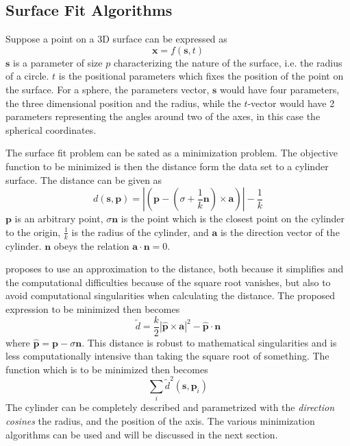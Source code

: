 \subsection{Surface Fit Algorithms}
\label{chap2:sec-surface-fit-alg}
Suppose a point on a 3D surface can be expressed as
\begin{equation}
    \mathbf{x} = f(\mathbf{s}, t)
\end{equation}
$\mathbf{s}$ is a parameter of size $p$ characterizing the nature of the surface, i.e. the
radius of a circle. $t$ is the positional parameters which fixes the position of the point
on the surface. For a sphere, the parameters vector, $\mathbf{s}$ would have four parameters,
the three dimensional position and the radius, while the $t$-vector would have 2
parameters representing the angles around two of the axes, in this case the spherical
coordinates.

The surface fit problem can be sated as a minimization problem. The
objective function to be minimized is then the distance form the data set to a cylinder
surface. The distance can be given as 
\begin{equation}
    d( \mathbf{s}, \mathbf{p})  = | ( \mathbf{p} - (\sigma + \frac{1}{k} \mathbf{n})
    \times \mathbf{a})| - \frac{1}{k}
\end{equation}
$\mathbf{p}$ is an arbitrary point, $\sigma \mathbf{n}$ is the point which is the closest
point on the cylinder to the origin, $\frac{1}{k}$ is the radius of the cylinder, and $\mathbf{a}$ is the
direction vector of the cylinder. $\mathbf{n}$ obeys the relation $\mathbf{a} \cdot
\mathbf{n} = 0$. 

\cite{ls-fit-cylinder} proposes to use an approximation to the distance, both because it
simplifies and the computational difficulties because of the square root vanishes, but
also to avoid computational singularities when calculating the distance. The proposed
expression to be minimized then becomes
\begin{equation}
    \tilde{d} = \frac{k}{2} |\hat{\mathbf{p}} \times \mathbf{a} | ^2 - \hat{\mathbf{p}} \cdot
    \mathbf{n}
\end{equation}
where $\hat{\mathbf{p}} = \mathbf{p} - \sigma \mathbf{n}$. This distance is robust to
mathematical singularities and is less computationally intensive than taking the square
root of something. The function which is to be minimized then becomes
\begin{equation}
    \label{chap2:eq-ls-cylinder-min}
    \sum_i \tilde{d}^2(\mathbf{s}, \mathbf{p}_i)
\end{equation}
The cylinder can be completely described and parametrized with the \emph{direction cosines} the radius, and
the position of the axis. The various minimization algorithms can be used and will be
discussed in the next section.


